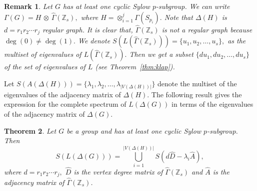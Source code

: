 \documentclass[11pt]{article}
\def \Z {{\mathbb Z}}
\def \Ga {{\Gamma}}
\newtheorem{theorem}{Theorem}[section]
\newtheorem{rem}[theorem]{Remark}
\begin{document}
 \begin{rem} 
  Let $G$ has at least one cyclic Sylow $p$-subgroup. 
    We can write $\Ga(G)=H\,\otimes\, \widehat\Ga(\Z_s),$
    where $H=\otimes_{i=1}^{j}\Ga(S_{p_i}).$ Note that $\Delta(H)$ is $d=r_1r_2\cdots r_j$ regular graph. It is clear that, $\widehat \Ga(\Z_s)$ is not a regular graph because $\deg(0)\neq \deg(1).$  We denote $S(L(\widehat\Ga(\Z_s)))=\{u_1,u_2,\dots ,u_s\},$ as the multiset of eigenvalues of $L(\widehat\Ga(\Z_s)).$
    Then we get a subset $\{du_1,du_2,\dots , du_s\}$ of the set of eigenvalues of $L$ (see Theorem~\ref{thm:klap}). 
 \end{rem}  


 Let $S(A(\Delta(H)))=\{\lambda_1,\lambda_2,\dots,\lambda_{|V(\Delta(H))|}\}$ denote the multiset of the eigenvalues of the adjacency matrix of $\Delta(H). $  The following result gives the expression for the complete spectrum of $L(\Delta(G))$ in terms of the eigenvalues of the adjacency matrix of $\Delta(G).$ 
    \begin{theorem}\label{thm:lap}
Let $G$ be a group and has at least one cyclic Sylow $p$-subgroup. Then
            \[ S\left(L(\Delta(G))\right)
               = \bigcup_{i=1}^{|V(\Delta(H))|} 
                  S\left(d \widehat{D} - \lambda_i \widehat{A}\right), \]
            where $d=r_1r_2\cdots r_j,$ 
            $\widehat{D}$ is the vertex degree matrix of $\widehat{\Gamma}(\mathbb{Z}_s)$ and  
            $\widehat{A}$ is the adjacency matrix of $\widehat{\Gamma}(\mathbb{Z}_s)$.\index{Spectrum!for $\Z_n\times \Z_m$}
     \end{theorem}
\end{document}
